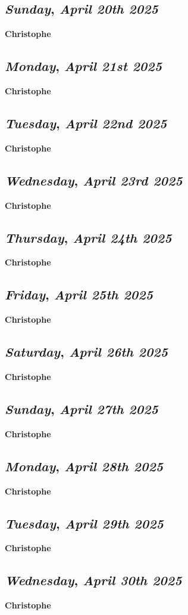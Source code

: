 \def\day{\textit{April 20th 2025}}
\def\weekday{\textit{Sunday}}
\subsection*{\weekday, \day}
\textbf {Christophe}

\def\day{\textit{April 21st 2025}}
\def\weekday{\textit{Monday}}
\subsection*{\weekday, \day}
\textbf {Christophe}

\def\day{\textit{April 22nd 2025}}
\def\weekday{\textit{Tuesday}}
\subsection*{\weekday, \day}
\textbf {Christophe}

\def\day{\textit{April 23rd 2025}}
\def\weekday{\textit{Wednesday}}
\subsection*{\weekday, \day}
\textbf {Christophe}

\def\day{\textit{April 24th 2025}}
\def\weekday{\textit{Thursday}}
\subsection*{\weekday, \day}
\textbf {Christophe}

\def\day{\textit{April 25th 2025}}
\def\weekday{\textit{Friday}}
\subsection*{\weekday, \day}
\textbf {Christophe}

\def\day{\textit{April 26th 2025}}
\def\weekday{\textit{Saturday}}
\subsection*{\weekday, \day}
\textbf {Christophe}

\def\day{\textit{April 27th 2025}}
\def\weekday{\textit{Sunday}}
\subsection*{\weekday, \day}
\textbf {Christophe}

\def\day{\textit{April 28th 2025}}
\def\weekday{\textit{Monday}}
\subsection*{\weekday, \day}
\textbf {Christophe}

\def\day{\textit{April 29th 2025}}
\def\weekday{\textit{Tuesday}}
\subsection*{\weekday, \day}
\textbf {Christophe}

\def\day{\textit{April 30th 2025}}
\def\weekday{\textit{Wednesday}}
\subsection*{\weekday, \day}
\textbf {Christophe}

